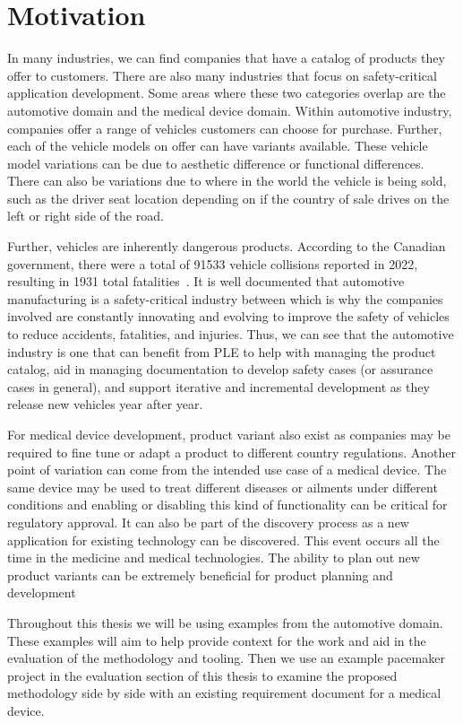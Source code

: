 \section{Motivation}

In many industries, we can find companies that have a catalog of products they offer to customers. There are also many industries that focus on safety-critical application development. Some areas where these two categories overlap are the automotive domain and the medical device domain. Within automotive industry, companies offer a range of vehicles customers can choose for purchase. Further, each of the vehicle models on offer can have variants available. These vehicle model variations can be due to aesthetic difference or functional differences. There can also be variations due to where in the world the vehicle is being sold, such as the driver seat location depending on if the country of sale drives on the left or right side of the road. 

Further, vehicles are inherently dangerous products. According to the Canadian government, there were a total of 91533 vehicle collisions reported in 2022, resulting in 1931 total fatalities~\cite{CanadaCrashStats}. It is well documented that automotive manufacturing is a safety-critical industry between which is why the companies involved are constantly innovating and evolving to improve the safety of vehicles to reduce accidents, fatalities, and injuries. Thus, we can see that the automotive industry is one that can benefit from \ac{PLE} to help with managing the product catalog, aid in managing documentation to develop safety cases (or assurance cases in general), and support iterative and incremental development as they release new vehicles year after year.

For medical device development, product variant also exist as companies may be required to fine tune or adapt a product to different country regulations. Another point of variation can come from the intended use case of a medical device. The same device may be used to treat different diseases or ailments under different conditions and enabling or disabling this kind of functionality can be critical for regulatory approval. It can also be part of the discovery process as a new application for existing technology can be discovered. This event occurs all the time in the medicine and medical technologies. The ability to plan out new product variants can be extremely beneficial for product planning and development

Throughout this thesis we will be using examples from the automotive domain. These examples will aim to help provide context for the work and aid in the evaluation of the methodology and tooling. Then we use an example pacemaker project in the evaluation section of this thesis to examine the proposed methodology side by side with an existing requirement document for a medical device.

